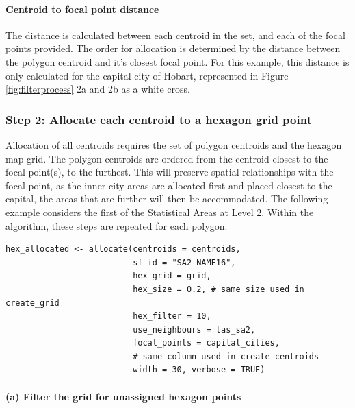 \hypertarget{centroid-to-focal-point-distance}{%
\paragraph{Centroid to focal point distance}\label{centroid-to-focal-point-distance}}

The distance is calculated between each centroid in the set, and each of the focal points provided. The order for allocation is determined by the distance between the polygon centroid and it's closest focal point. For this example, this distance is only calculated for the capital city of Hobart, represented in Figure \ref{fig:filterprocess} 2a and 2b as a white cross.

\hypertarget{step-2-allocate-each-centroid-to-a-hexagon-grid-point}{%
\subsubsection{Step 2: Allocate each centroid to a hexagon grid point}\label{step-2-allocate-each-centroid-to-a-hexagon-grid-point}}

Allocation of all centroids requires the set of polygon centroids and the hexagon map grid. The polygon centroids are ordered from the centroid closest to the focal point(s), to the furthest. This will preserve spatial relationships with the focal point, as the inner city areas are allocated first and placed closest to the capital, the areas that are further will then be accommodated. The following example considers the first of the Statistical Areas at Level 2. Within the algorithm, these steps are repeated for each polygon.

\begin{verbatim}
hex_allocated <- allocate(centroids = centroids,
                          sf_id = "SA2_NAME16",
                          hex_grid = grid,
                          hex_size = 0.2, # same size used in create_grid
                          hex_filter = 10,
                          use_neighbours = tas_sa2,
                          focal_points = capital_cities,
                          # same column used in create_centroids
                          width = 30, verbose = TRUE)
\end{verbatim}

\hypertarget{a-filter-the-grid-for-unassigned-hexagon-points}{%
\paragraph{(a) Filter the grid for unassigned hexagon points}\label{a-filter-the-grid-for-unassigned-hexagon-points}}

